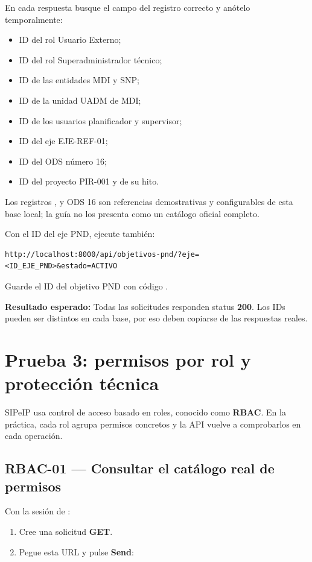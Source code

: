 \documentclass[11pt,a4paper]{article}
\newcommand{\esperado}[1]{\textcolor{VerdeResultado}{\textbf{Resultado esperado:}} #1}
\begin{document}
En cada respuesta busque el campo  del registro correcto y anótelo temporalmente:

\begin{itemize}
  \item ID del rol Usuario Externo;
  \item ID del rol Superadministrador técnico;
  \item ID de las entidades MDI y SNP;
  \item ID de la unidad UADM de MDI;
  \item ID de los usuarios planificador y supervisor;
  \item ID del eje EJE-REF-01;
  \item ID del ODS número 16;
  \item ID del proyecto PIR-001 y de su hito.
\end{itemize}

Los registros ,  y ODS 16 son referencias demostrativas y configurables de esta base local; la guía no los presenta como un catálogo oficial completo.

Con el ID del eje PND, ejecute también:

\begin{lstlisting}
http://localhost:8000/api/objetivos-pnd/?eje=<ID_EJE_PND>&estado=ACTIVO
\end{lstlisting}

Guarde el ID del objetivo PND con código .

\esperado{Todas las solicitudes responden status \textbf{200}. Los IDs pueden ser distintos en cada base, por eso deben copiarse de las respuestas reales.}

\section{Prueba 3: permisos por rol y protección técnica}

SIPeIP usa control de acceso basado en roles, conocido como \textbf{RBAC}. En la práctica, cada rol agrupa permisos concretos y la API vuelve a comprobarlos en cada operación.

\subsection{RBAC-01 --- Consultar el catálogo real de permisos}

Con la sesión de :

\begin{enumerate}
  \item Cree una solicitud \textbf{GET}.
  \item Pegue esta URL y pulse \textbf{Send}:
\end{enumerate}
\end{document}

